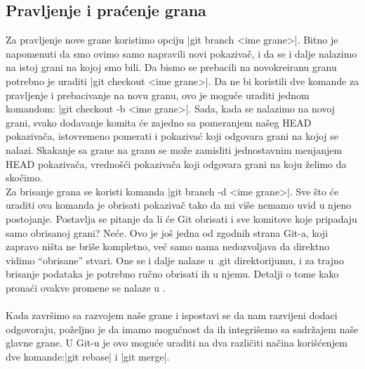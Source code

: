 \documentclass[a4paper]{article}
\begin{document}
{\subsection{Pravljenje i praćenje grana}
\label{subsec:pravljenje_grana}
Za pravljenje nove grane koristimo opciju |git branch <ime grane>|. Bitno je napomenuti da smo ovimo samo napravili novi pokazivač, i da se i dalje nalazimo na istoj grani na kojoj smo bili. Da bismo se prebacili na novokreiranu granu potrebno je uraditi |git checkout <ime grane>|. Da ne bi koristili dve komande za pravljenje i prebacivanje na novu granu, ovo je moguće uraditi jednom komandom: |git checkout -b <ime grane>|. 
Sada, kada se nalazimo na novoj grani, svako dodavanje komita će zajedno sa pomeranjem našeg HEAD pokazivača, istovremeno pomerati i pokazivać koji odgovara grani na kojoj se nalazi. Skakanje sa grane na granu se može zamisliti jednostavnim menjanjem HEAD pokazivača, vrednošći pokazivača koji odgovara grani na koju želimo da skočimo.\\
Za brisanje grana se koristi komanda |git branch -d <ime grane>|. Sve što će uraditi ova komanda je obrisati pokazivač tako da mi više nemamo uvid u njeno postojanje. Postavlja se pitanje da li će Git obrisati i sve komitove koje pripadaju samo obrisanoj grani? Neće. Ovo je još jedna od zgodnih strana Git-a, koji zapravo ništa ne briše kompletno, već samo nama nedozvoljava da direktno vidimo ``obrisane'' stvari. One se i dalje nalaze u .git direktorijumu, i za trajno brisanje podataka je potrebno ručno obrisati ih u njemu. Detalji o tome kako pronaći ovakve promene se nalaze u \cite{progit}.\\\\
Kada završimo sa razvojem naše grane i ispostavi se da nam razvijeni dodaci odgovoraju, poželjno je da imamo mogućnost da ih integrišemo sa sadržajem naše glavne grane. U Git-u je ovo moguće uraditi na dva različiti načina korišćenjem dve komande:|git rebase| i |git merge|.  

}
\end{document}
